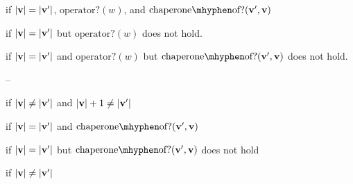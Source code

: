 \documentclass{sigplanconf}
\begin{document}
if $|\mathbf{v}|=|\mathbf{v'}|$, $\mathrm{operator?}(w)$, and $\mathrm{chaperone\mhyphen of?}(\vvp,\vv)$

if $|\mathbf{v}|=|\mathbf{v'}|$ but $\mathrm{operator?}(w)$ does not hold.

if $|\mathbf{v}|=|\mathbf{v'}|$ and $\mathrm{operator?}(w)$ but $\mathrm{chaperone\mhyphen of?}(\vvp,\vv)$ does not hold.

--

if $|\mathbf{v}|\ne|\mathbf{v'}|$ and $|\mathbf{v}|+1\ne|\mathbf{v'}|$







\red{\sval{\chacrk{\vv}::\ks}{\sigma}{\vvp}}{\sval{\ks}{\sigma}{\vvp}}
if $|\mathbf{v}|=|\mathbf{v'}|$ and $\mathrm{chaperone\mhyphen of?}(\vvp,\vv)$

if $|\mathbf{v}|=|\mathbf{v'}|$ but $\mathrm{chaperone\mhyphen of?}(\vvp,\vv)$ does not hold

if $|\mathbf{v}|\ne|\mathbf{v'}|$










\end{document}
